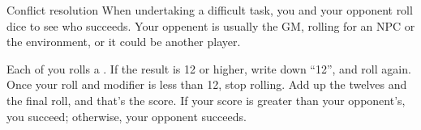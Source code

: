 
\begin{abstractsection}{Conflict resolution}
When undertaking a difficult task, you and your opponent roll dice to see who succeeds. Your oppenent is usually the GM, rolling for an NPC or the environment, or it could be another player.

Each of you rolls a . If the result is 12 or higher, write down ``12'', and roll again. Once your roll and modifier is less than 12, stop rolling. Add up the twelves and the final roll, and that's the score. If your score is greater than your opponent's, you succeed; otherwise, your opponent succeeds.
\end{abstractsection}
